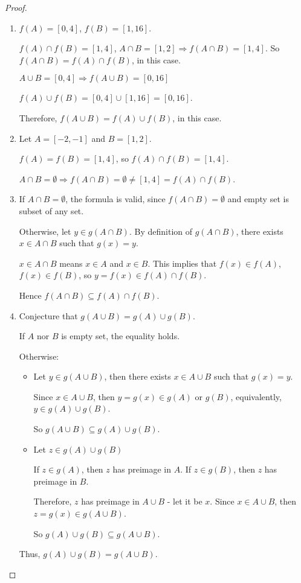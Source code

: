 \documentclass[class=understanding-analysis,crop=false]{standalone}
\begin{document}
\begin{proof}
    \begin{enumerate}[label = (\alph*)]
        \item $f(A) = [0, 4]$, $f(B) = [1, 16]$.
              \par $f(A)\cap f(B) = [1, 4]$, $A\cap B = [1, 2]\Rightarrow f(A\cap B) = [1, 4]$. So $f(A\cap B) = f(A)\cap f(B)$, in this case.
              \par $A\cup B = [0, 4]\Rightarrow f(A\cup B) = [0, 16]$
              \par $f(A)\cup f(B) = [0, 4]\cup [1, 16] = [0, 16]$.
              \par Therefore, $f(A\cup B) = f(A)\cup f(B)$, in this case.
        \item Let $A = [-2, -1]$ and $B = [1, 2]$.
              \par $f(A) = f(B) = [1, 4]$, so $f(A)\cap f(B) = [1, 4]$.
              \par $A\cap B = \emptyset\Rightarrow f(A\cap B) = \emptyset\ne [1, 4] = f(A)\cap f(B)$.
        \item If $A\cap B = \emptyset$, the formula is valid, since $f(A\cap B) = \emptyset$ and empty set is subset of any set.
              \par Otherwise, let $y\in g(A\cap B)$. By definition of $g(A\cap B)$, there exists $x\in A\cap B$ such that $g(x) = y$.
              \par $x\in A\cap B$ means $x\in A$ and $x\in B$. This implies that $f(x)\in f(A)$, $f(x)\in f(B)$, so $y = f(x) \in f(A)\cap f(B)$.
              \par Hence $f(A\cap B)\subseteq f(A)\cap f(B)$.
        \item Conjecture that $g(A\cup B) = g(A)\cup g(B)$.
              \par If $A$ nor $B$ is empty set, the equality holds.
              \par Otherwise:
              \begin{itemize}
                  \item Let $y\in g(A\cup B)$, then there exists $x\in A\cup B$ such that $g(x) = y$.
                        \par Since $x\in A\cup B$, then $y = g(x) \in g(A)$ or $g(B)$, equivalently, $y\in g(A)\cup g(B)$.
                        \par So $g(A\cup B)\subseteq g(A)\cup g(B)$.
                  \item Let $z\in g(A)\cup g(B)$
                        \par If $z\in g(A)$, then $z$ has preimage in $A$. If $z\in g(B)$, then $z$ has preimage in $B$.
                        \par Therefore, $z$ has preimage in $A\cup B$ - let it be $x$. Since $x\in A\cup B$, then $z = g(x)\in g(A\cup B)$.
                        \par So $g(A)\cup g(B)\subseteq g(A\cup B)$.
              \end{itemize}
              \par Thus, $g(A)\cup g(B) = g(A\cup B)$.
    \end{enumerate}
\end{proof}
\end{document}
